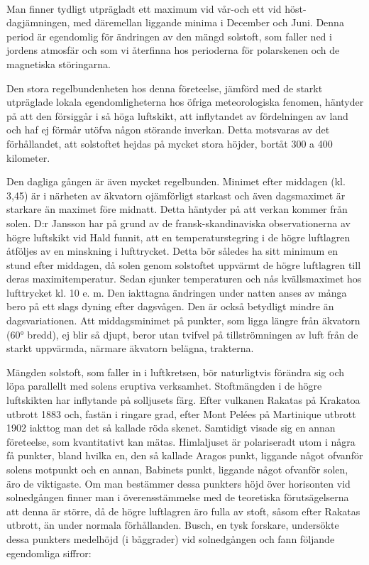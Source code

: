 \documentclass[a4paper, 12pt, oneside, swedish]{article}
\begin{document}
\paragraph{}
Man finner tydligt utprägladt ett maximum vid vår-och ett vid höst-dagjämningen, med däremellan liggande minima i December och Juni. Denna period är egendomlig för ändringen av den mängd solstoft, som faller ned i jordens atmosfär och som vi återfinna hos perioderna för polarskenen och de magnetiska störingarna.

Den stora regelbundenheten hos denna företeelse, jämförd med de starkt utpräglade lokala egendomligheterna hos öfriga meteorologiska fenomen, häntyder på att den försiggår i så höga luftskikt, att inflytandet av fördelningen av land och haf ej förmår utöfva någon störande inverkan. Detta motsvaras av det förhållandet, att solstoftet hejdas på mycket stora höjder, bortåt 300 a 400 kilometer.

Den dagliga gången är även mycket regelbunden. Minimet efter middagen (kl. 3,45) är i närheten av äkvatorn ojämförligt starkast och även dagsmaximet är starkare än maximet före midnatt. Detta häntyder på att verkan kommer från solen. D:r Jansson har på grund av de fransk-skandinaviska observationerna av högre luftskikt vid Hald funnit, att en temperaturstegring i de högre luftlagren åtföljes av en minskning i lufttrycket. Detta bör således ha sitt minimum en stund efter middagen, då solen genom solstoftet uppvärmt de högre luftlagren till deras maximitemperatur. Sedan sjunker temperaturen och nås kvällsmaximet hos lufttrycket kl. 10 e. m. Den iakttagna ändringen under natten anses av många bero på ett slags dyning efter dagsvågen. Den är också betydligt mindre än dagsvariationen. Att middagsminimet på punkter, som ligga längre från äkvatorn (60° bredd), ej blir så djupt, beror utan tvifvel på tillströmningen av luft från de starkt uppvärmda, närmare äkvatorn belägna, trakterna.

Mängden solstoft, som faller in i luftkretsen, bör naturligtvis förändra sig och löpa parallellt med solens eruptiva verksamhet. Stoftmängden i de högre luftskikten har inflytande på solljusets färg. Efter vulkanen Rakatas på Krakatoa utbrott 1883 och, fastän i ringare grad, efter Mont Pelées på Martinique utbrott 1902 iakttog man det så kallade röda skenet. Samtidigt visade sig en annan företeelse, som kvantitativt kan mätas. Himlaljuset är polariseradt utom i några få punkter, bland hvilka en, den så kallade Aragos punkt, liggande något ofvanför solens motpunkt och en annan, Babinets punkt, liggande något ofvanför solen, äro de viktigaste. Om man bestämmer dessa punkters höjd över horisonten vid solnedgången finner man i överensstämmelse med de teoretiska förutsägelserna att denna är större, då de högre luftlagren äro fulla av stoft, såsom efter Rakatas utbrott, än under normala förhållanden. Busch, en tysk forskare, undersökte dessa punkters medelhöjd (i båggrader) vid solnedgången och fann följande egendomliga siffror:
\end{document}
